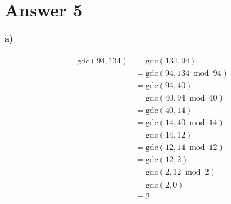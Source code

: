 \documentclass[12pt]{article}
\newcommand\+{\mkern2mu}
\begin{document}
\section*{Answer 5}
\paragraph{a)}
\begin{align*}
\text{gdc}(94, 134) &= \text{gdc}(134, 94) \\
&= \text{gdc}(94, 134 \bmod 94) \\
&= \text{gdc}(94, 40) \\
&= \text{gdc}(40, 94 \bmod 40) \\
&= \text{gdc}(40, 14) \\
&= \text{gdc}(14, 40 \bmod 14) \\
&= \text{gdc}(14, 12) \\
&= \text{gdc}(12, 14 \bmod 12) \\
&= \text{gdc}(12, 2) \\
&= \text{gdc}(2, 12 \bmod 2) \\
&= \text{gdc}(2, 0) \\
&= 2
\end{align*}

\newpage
\end{document}
